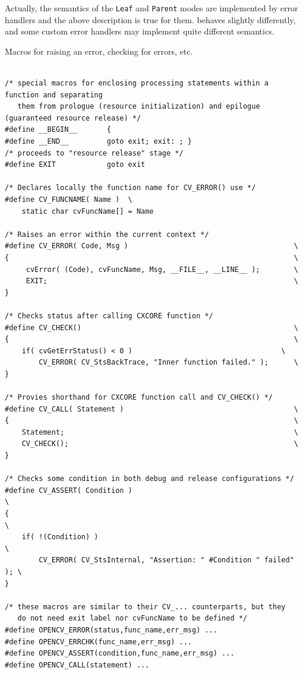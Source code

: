 Actually, the semantics of the \texttt{Leaf} and \texttt{Parent} modes are implemented by error handlers and the above description is true for them.  behaves slightly differently, and some custom error handlers may implement quite different semantics.  

Macros for raising an error, checking for errors, etc.
\begin{lstlisting}

/* special macros for enclosing processing statements within a function and separating
   them from prologue (resource initialization) and epilogue (guaranteed resource release) */
#define __BEGIN__       {
#define __END__         goto exit; exit: ; }
/* proceeds to "resource release" stage */
#define EXIT            goto exit

/* Declares locally the function name for CV_ERROR() use */
#define CV_FUNCNAME( Name )  \
    static char cvFuncName[] = Name

/* Raises an error within the current context */
#define CV_ERROR( Code, Msg )                                       \
{                                                                   \
     cvError( (Code), cvFuncName, Msg, __FILE__, __LINE__ );        \
     EXIT;                                                          \
}

/* Checks status after calling CXCORE function */
#define CV_CHECK()                                                  \
{                                                                   \
    if( cvGetErrStatus() < 0 )                                   \
        CV_ERROR( CV_StsBackTrace, "Inner function failed." );      \
}

/* Provies shorthand for CXCORE function call and CV_CHECK() */
#define CV_CALL( Statement )                                        \
{                                                                   \
    Statement;                                                      \
    CV_CHECK();                                                     \
}

/* Checks some condition in both debug and release configurations */
#define CV_ASSERT( Condition )                                          \
{                                                                       \
    if( !(Condition) )                                                  \
        CV_ERROR( CV_StsInternal, "Assertion: " #Condition " failed" ); \
}

/* these macros are similar to their CV_... counterparts, but they
   do not need exit label nor cvFuncName to be defined */
#define OPENCV_ERROR(status,func_name,err_msg) ...
#define OPENCV_ERRCHK(func_name,err_msg) ...
#define OPENCV_ASSERT(condition,func_name,err_msg) ...
#define OPENCV_CALL(statement) ...

\end{lstlisting}

